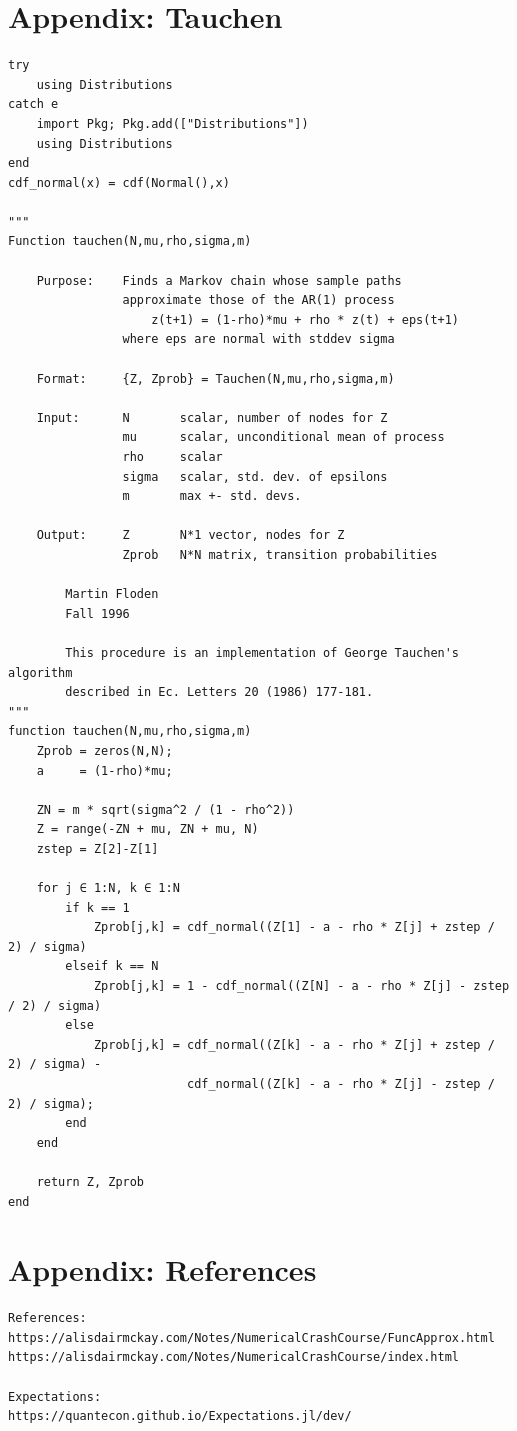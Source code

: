 \documentclass[12pt]{article}
\begin{document}
\section*{Appendix: Tauchen}
\begin{lstlisting}[language=JuliaLocal, style=julia]
try
    using Distributions
catch e
    import Pkg; Pkg.add(["Distributions"])
    using Distributions
end
cdf_normal(x) = cdf(Normal(),x)

"""
Function tauchen(N,mu,rho,sigma,m)

    Purpose:    Finds a Markov chain whose sample paths
                approximate those of the AR(1) process
                    z(t+1) = (1-rho)*mu + rho * z(t) + eps(t+1)
                where eps are normal with stddev sigma

    Format:     {Z, Zprob} = Tauchen(N,mu,rho,sigma,m)

    Input:      N       scalar, number of nodes for Z
                mu      scalar, unconditional mean of process
                rho     scalar
                sigma   scalar, std. dev. of epsilons
                m       max +- std. devs.

    Output:     Z       N*1 vector, nodes for Z
                Zprob   N*N matrix, transition probabilities

        Martin Floden
        Fall 1996

        This procedure is an implementation of George Tauchen's algorithm
        described in Ec. Letters 20 (1986) 177-181.
"""
function tauchen(N,mu,rho,sigma,m)
    Zprob = zeros(N,N);
    a     = (1-rho)*mu;

    ZN = m * sqrt(sigma^2 / (1 - rho^2))
    Z = range(-ZN + mu, ZN + mu, N)
	zstep = Z[2]-Z[1]
    
    for j ∈ 1:N, k ∈ 1:N
		if k == 1
			Zprob[j,k] = cdf_normal((Z[1] - a - rho * Z[j] + zstep / 2) / sigma)
		elseif k == N
			Zprob[j,k] = 1 - cdf_normal((Z[N] - a - rho * Z[j] - zstep / 2) / sigma)
		else
			Zprob[j,k] = cdf_normal((Z[k] - a - rho * Z[j] + zstep / 2) / sigma) - 
						 cdf_normal((Z[k] - a - rho * Z[j] - zstep / 2) / sigma);
		end
    end
    
    return Z, Zprob
end
\end{lstlisting}








\newpage
\section*{Appendix: References}
\begin{lstlisting}[language=JuliaLocal, style=julia]
References:
https://alisdairmckay.com/Notes/NumericalCrashCourse/FuncApprox.html
https://alisdairmckay.com/Notes/NumericalCrashCourse/index.html

Expectations:
https://quantecon.github.io/Expectations.jl/dev/
\end{lstlisting}
\end{document}

